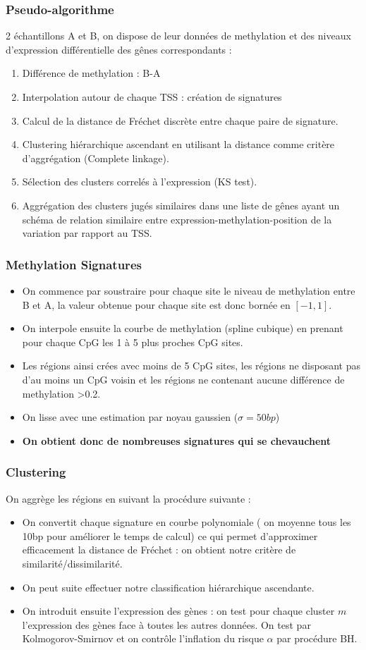 \documentclass{beamer}
\begin{document}
\begin{frame}
\frametitle{Pseudo-algorithme}
2 échantillons A et B, on dispose de leur données de methylation et des niveaux d'expression différentielle des gênes correspondants :
\begin{enumerate}
\item <1-> Différence de methylation : B-A
\item <2-> Interpolation autour de chaque TSS : création de signatures
\item <3-> Calcul de la distance de Fréchet discrète entre chaque paire de signature.
\item <4-> Clustering hiérarchique ascendant en utilisant la distance comme critère d'aggrégation (Complete linkage).
\item <5-> Sélection des clusters correlés à l'expression (KS test).
\item <6-> Aggrégation des clusters jugés similaires dans une liste de gênes ayant un schéma de relation similaire entre expression-methylation-position de la variation par rapport au TSS.
\end{enumerate}
\end{frame}

\begin{frame}
\frametitle{Methylation Signatures}
\begin{itemize}
\item On commence par soustraire pour chaque site le niveau de methylation entre B et A, la valeur obtenue pour chaque site est donc bornée en $[-1,1]$.
\item On interpole ensuite la courbe de methylation (spline cubique) en prenant pour chaque CpG les 1 à 5 plus proches CpG sites.
\item Les régions ainsi crées avec moins de 5 CpG sites, les régions ne disposant pas d'au moins un CpG voisin et les régions ne contenant aucune différence de methylation >0.2.
\item On lisse avec une estimation par noyau gaussien ($\sigma = 50bp$)
\item <2-> \textbf{On obtient donc de nombreuses signatures qui se chevauchent}
\end{itemize}
\end{frame}

\begin{frame}
\frametitle{Clustering}
On aggrège les régions en suivant la procédure suivante :
\begin{itemize}
\item On convertit chaque signature en courbe polynomiale ( on moyenne tous les 10bp pour améliorer le temps de calcul) ce qui permet d'approximer efficacement la distance de Fréchet : on obtient notre critère de similarité/dissimilarité.
\item On peut suite effectuer notre classification hiérarchique ascendante.
\item On introduit ensuite l'expression des gènes : on test pour chaque cluster $m$ l'expression des gènes face à toutes les autres données. On test par Kolmogorov-Smirnov et on contrôle l'inflation du risque $\alpha$ par procédure BH.
\end{itemize}
\end{frame}
\end{document}
